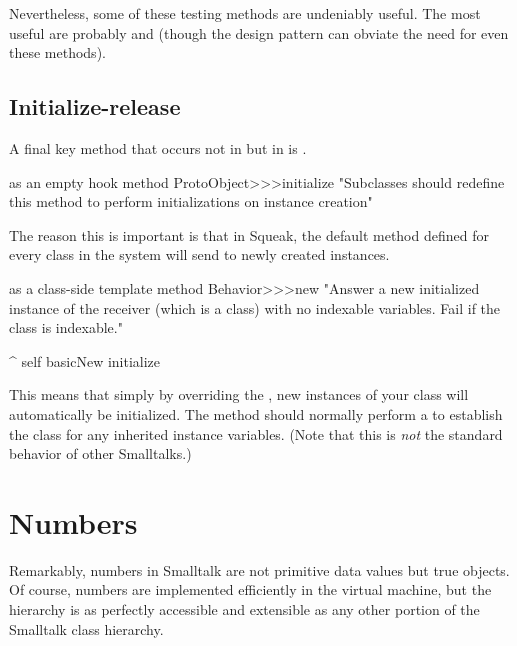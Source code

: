 \documentclass[a4paper,10pt,twoside]{book}
\begin{document}
Nevertheless, some of these testing methods are undeniably useful.
The most useful are probably  and  (though the \cite{Wool98a} design pattern can obviate the need for even these methods).


\subsection{Initialize-release}

A final key method that occurs not in  but in  is .

\begin{method}{ as an empty hook method}
ProtoObject>>>initialize
    "Subclasses should redefine this method to perform initializations on instance creation"
\end{method}

The reason this is important is that in Squeak, the default  method defined for every class in the system will send  to newly created instances.

\begin{method}{ as a class-side template method}
Behavior>>>new
    "Answer a new initialized instance of the receiver (which is a class) with no indexable variables. Fail if the class is indexable."

    ^ self basicNew initialize
\end{method}

This means that simply by overriding the  , new instances of your class will automatically be initialized.
The  method should normally perform a  to establish the class  for any inherited instance variables.
(Note that this is \emph{not} the standard behavior of other Smalltalks.)

\section{Numbers}
\label{sec:Number}
Remarkably, numbers in Smalltalk are not primitive data values but true objects.
Of course, numbers are implemented efficiently in the virtual machine, but the  hierarchy is as perfectly accessible and extensible as any other portion of the Smalltalk class hierarchy.
\end{document}
